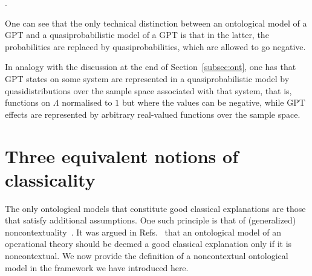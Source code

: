 \documentclass[10pt,twocolumn,aps,groupedaddress,nofootinbib]{revtex4}
\newcommand{\john}[1]{{\color{red} #1}}
\begin{document}
\begin{definition}
\begin{enumerate}
.
\eeq
\end{enumerate}
\end{definition}

One can see that the only technical distinction between an ontological model of a GPT and a quasiprobabilistic model of a GPT is that in the latter, the probabilities are replaced by quasiprobabilities, which are allowed to go negative.

In analogy with the discussion at the end of Section~\ref{subsec:ont}, one has that GPT states on some system are represented in a quasiprobabilistic model by quasidistributions over the sample space associated with that system, that is, functions on $\Lambda$ normalised to $1$ but where the values can be negative, while GPT effects are represented by arbitrary real-valued functions over the sample space.

\section{Three equivalent notions of classicality} \label{threenotions}

The only ontological models that constitute good classical explanations are those that satisfy additional assumptions.
One such principle is that of (generalized) noncontextuality~\cite{Spekkens2005}. It was argued in Refs.~\cite{Spekkens2005,Pirsa_nc,Spekkens2008,schmid2019characterization}
that an ontological model of an operational theory should be deemed a good classical explanation only if it is noncontextual.
We now provide the definition of a noncontextual ontological model in the framework we have introduced here.
\end{document}
